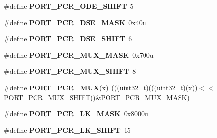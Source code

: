 \begin{DoxyCompactItemize}
\item 
\#define {\bfseries P\+O\+R\+T\+\_\+\+P\+C\+R\+\_\+\+O\+D\+E\+\_\+\+S\+H\+I\+FT}~5\hypertarget{group__PORT__Register__Masks_gac4871a3c3a20a51a3a57131d34e427e0}{}\label{group__PORT__Register__Masks_gac4871a3c3a20a51a3a57131d34e427e0}

\item 
\#define {\bfseries P\+O\+R\+T\+\_\+\+P\+C\+R\+\_\+\+D\+S\+E\+\_\+\+M\+A\+SK}~0x40u\hypertarget{group__PORT__Register__Masks_gae1c37b9f66e58bd80e7764232fd05cee}{}\label{group__PORT__Register__Masks_gae1c37b9f66e58bd80e7764232fd05cee}

\item 
\#define {\bfseries P\+O\+R\+T\+\_\+\+P\+C\+R\+\_\+\+D\+S\+E\+\_\+\+S\+H\+I\+FT}~6\hypertarget{group__PORT__Register__Masks_ga00ae08038ade5432d0240666658d8867}{}\label{group__PORT__Register__Masks_ga00ae08038ade5432d0240666658d8867}

\item 
\#define {\bfseries P\+O\+R\+T\+\_\+\+P\+C\+R\+\_\+\+M\+U\+X\+\_\+\+M\+A\+SK}~0x700u\hypertarget{group__PORT__Register__Masks_ga0feec5fc6b285b83c573f913c74e5c41}{}\label{group__PORT__Register__Masks_ga0feec5fc6b285b83c573f913c74e5c41}

\item 
\#define {\bfseries P\+O\+R\+T\+\_\+\+P\+C\+R\+\_\+\+M\+U\+X\+\_\+\+S\+H\+I\+FT}~8\hypertarget{group__PORT__Register__Masks_gaa39e1cfed4df3797e4f1d141adab8776}{}\label{group__PORT__Register__Masks_gaa39e1cfed4df3797e4f1d141adab8776}

\item 
\#define {\bfseries P\+O\+R\+T\+\_\+\+P\+C\+R\+\_\+\+M\+UX}(x)~(((uint32\+\_\+t)(((uint32\+\_\+t)(x))$<$$<$P\+O\+R\+T\+\_\+\+P\+C\+R\+\_\+\+M\+U\+X\+\_\+\+S\+H\+I\+FT))\&P\+O\+R\+T\+\_\+\+P\+C\+R\+\_\+\+M\+U\+X\+\_\+\+M\+A\+SK)\hypertarget{group__PORT__Register__Masks_ga13b6c873e0e5385583b1f7907a9f796a}{}\label{group__PORT__Register__Masks_ga13b6c873e0e5385583b1f7907a9f796a}

\item 
\#define {\bfseries P\+O\+R\+T\+\_\+\+P\+C\+R\+\_\+\+L\+K\+\_\+\+M\+A\+SK}~0x8000u\hypertarget{group__PORT__Register__Masks_ga671e65e4960f3b103af68881ae99d85a}{}\label{group__PORT__Register__Masks_ga671e65e4960f3b103af68881ae99d85a}

\item 
\#define {\bfseries P\+O\+R\+T\+\_\+\+P\+C\+R\+\_\+\+L\+K\+\_\+\+S\+H\+I\+FT}~15\hypertarget{group__PORT__Register__Masks_ga72ad78bf008f1968310a8abcd09b29ea}{}\label{group__PORT__Register__Masks_ga72ad78bf008f1968310a8abcd09b29ea}


\end{DoxyCompactItemize}

